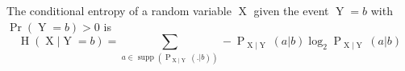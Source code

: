 The conditional entropy of a random variable $\operatorname{X}$ given the event $\operatorname{Y} = b$ with $\operatorname{Pr}(\operatorname{Y} = b) > 0$ is
$$\operatorname{H}(\operatorname{X} | \operatorname{Y} = b) = \sum\limits_{a \in \operatorname{supp}(\operatorname{P}_{\operatorname{X} | \operatorname{Y}}(. | b))} - \operatorname{P}_{\operatorname{X} | \operatorname{Y}}(a|b) \log_2 \operatorname{P}_{\operatorname{X} | \operatorname{Y}}(a | b)$$
